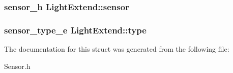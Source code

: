 \subsubsection[{sensor}]{\setlength{\rightskip}{0pt plus 5cm}sensor\-\_\-h Light\-Extend\-::sensor}\label{structLightExtend_a77688fb3024588e9665b62b247edaf46}
\subsubsection[{type}]{\setlength{\rightskip}{0pt plus 5cm}sensor\-\_\-type\-\_\-e Light\-Extend\-::type}\label{structLightExtend_ad3f196c5731075f0adab9baaecb48e4d}


The documentation for this struct was generated from the following file\-:\begin{DoxyCompactItemize}
\item 
Sensor.\-h\end{DoxyCompactItemize}
